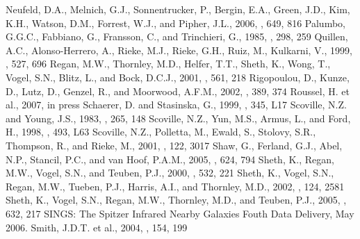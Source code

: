 \documentclass[manuscript]{aastex}
\begin{document}
\begin{thebibliography}{}
 Neufeld, D.A., Melnich, G.J., Sonnentrucker, P., Bergin, E.A., Green, J.D., Kim, K.H., Watson, D.M., Forrest, W.J., and Pipher, J.L., 2006, \apj, 649, 816 
 Palumbo, G.G.C., Fabbiano, G., Fransson, C., and Trinchieri, G., 1985, \apj, 298, 259
 Quillen, A.C., Alonso-Herrero, A., Rieke, M.J., Rieke, G.H., Ruiz, M., Kulkarni, V., 1999, \apj, 527, 696 
 Regan, M.W., Thornley, M.D., Helfer, T.T., Sheth, K., Wong, T., Vogel, S.N., Blitz, L., and Bock, D.C.J., 2001, \apj, 561, 218
 Rigopoulou, D., Kunze, D., Lutz, D., Genzel, R., and Moorwood, A.F.M., 2002, \aap, 389, 374
 Roussel, H. et al., 2007, in press
 Schaerer, D. and Stasinska, G., 1999, \aap, 345, L17
 Scoville, N.Z. and Young, J.S., 1983, \aj, 265, 148
 Scoville, N.Z., Yun, M.S., Armus, L., and Ford, H., 1998, \apj, 493, L63 
 Scoville, N.Z., Polletta, M., Ewald, S., Stolovy, S.R., Thompson, R., and Rieke, M., 2001, \aj, 122, 3017
 Shaw, G., Ferland, G.J., Abel, N.P., Stancil, P.C., and van Hoof, P.A.M., 2005, \apj, 624, 794
 Sheth, K., Regan, M.W., Vogel, S.N., and Teuben, P.J., 2000, \apj, 532, 221 
 Sheth, K., Vogel, S.N., Regan, M.W., Tueben, P.J., Harris, A.I., and Thornley, M.D., 2002, \aj, 124, 2581
 Sheth, K., Vogel, S.N., Regan, M.W., Thornley, M.D., and Teuben, P.J., 2005, \apj, 632, 217
 SINGS: The Spitzer Infrared Nearby Galaxies Fouth Data Delivery, May 2006.
 Smith, J.D.T. et al., 2004, \apjs, 154, 199

\end{thebibliography}
\end{document}
